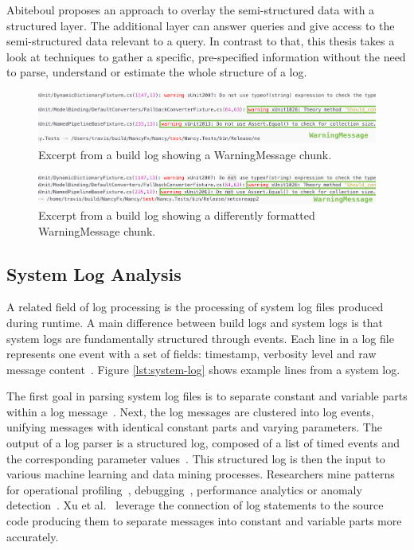 \documentclass[\myrootdir/main.tex]{subfiles}
\begin{document}
Abiteboul proposes an approach to overlay the semi-structured data with a structured layer.
The additional layer can answer queries and give access to the semi-structured data relevant to a query.
In contrast to that, this thesis takes a look at techniques to gather a specific, pre-specified information without the need to parse, understand or estimate the whole structure of a log.

\begin{figure}[H]
	\centering
	\includegraphics[width=\textwidth, clip]{img/log42.png}
	\caption{Excerpt from a build log showing a WarningMessage chunk.}
	\label{fig:log-4}
\end{figure}
\begin{figure}[H]
	\centering
	\includegraphics[width=\textwidth, clip]{img/log52.png}
	\caption{Excerpt from a build log showing a differently formatted WarningMessage chunk.}
	\label{fig:log-5}
\end{figure}

\subsection{System Log Analysis}
\label{sec:log-analysis}
A related field of log processing is the processing of system log files produced during runtime.
A main difference between build logs and system logs is that system logs are fundamentally structured through events.
Each line in a log file represents one event with a set of fields: timestamp, verbosity level and raw message content~\cite{he2017towards}.
Figure \ref{lst:system-log} shows example lines from a system log.

The first goal in parsing system log files is to separate constant and variable parts within a log message~\cite{nagappan2010abstracting,he2017towards}.
Next, the log messages are clustered into log events, unifying messages with identical constant parts and varying parameters.
The output of a log parser is a structured log, composed of a list of timed events and the corresponding parameter values~\cite{he2016evaluation}.
This structured log is then the input to various machine learning and data mining processes.
Researchers mine patterns for operational profiling~\cite{nagappan2009efficiently}, debugging~\cite{oliner2012advances}, performance analytics or anomaly detection~\cite{nagappan2010abstracting}.
Xu et al.~\cite{xu2009detecting} leverage the connection of log statements to the source code producing them to separate messages into constant and variable parts more accurately.
\end{document}
